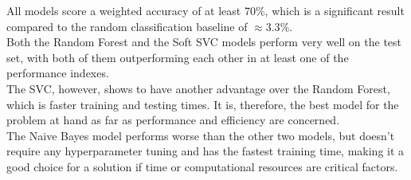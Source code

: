 \documentclass{article}
\begin{document}
All models score a weighted accuracy of at least 70\%, which is a significant result compared to the random classification baseline of $\approx 3.3\%$.\\
Both the Random Forest and the Soft SVC models perform very well on the test set, 
with both of them outperforming each other in at least one of the performance indexes.\\
The SVC, however, shows to have another advantage over the Random Forest, which is faster training and testing times. 
It is, therefore, the best model for the problem at hand as far as performance and efficiency are concerned.\\
The Naive Bayes model performs worse than the other two models,
but doesn't require any hyperparameter tuning and has the fastest training time, 
making it a good choice for a solution if time or computational resources are critical factors.\\






\end{document}
